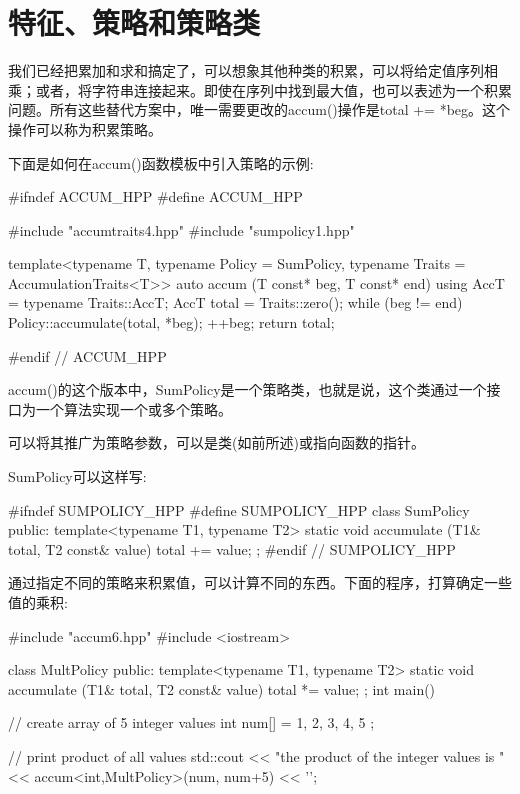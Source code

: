\section{特征、策略和策略类}

我们已经把累加和求和搞定了，可以想象其他种类的积累，可以将给定值序列相乘；或者，将字符串连接起来。即使在序列中找到最大值，也可以表述为一个积累问题。所有这些替代方案中，唯一需要更改的accum()操作是total += *beg。这个操作可以称为积累策略。

下面是如何在accum()函数模板中引入策略的示例:

\begin{cpp}
#ifndef ACCUM_HPP
#define ACCUM_HPP

#include "accumtraits4.hpp"
#include "sumpolicy1.hpp"

template<typename T,
		typename Policy = SumPolicy,
		typename Traits = AccumulationTraits<T>>
auto accum (T const* beg, T const* end)
{
	using AccT = typename Traits::AccT;
	AccT total = Traits::zero();
	while (beg != end) {
		Policy::accumulate(total, *beg);
		++beg;
	}
	return total;
}

#endif // ACCUM_HPP
\end{cpp}

accum()的这个版本中，SumPolicy是一个策略类，也就是说，这个类通过一个接口为一个算法实现一个或多个策略。

\begin{notice}
可以将其推广为策略参数，可以是类(如前所述)或指向函数的指针。
\end{notice}

SumPolicy可以这样写:

\begin{cpp}
#ifndef SUMPOLICY_HPP
#define SUMPOLICY_HPP
class SumPolicy {
	public:
	template<typename T1, typename T2>
	static void accumulate (T1& total, T2 const& value) {
		total += value;
	}
};
#endif // SUMPOLICY_HPP
\end{cpp}

通过指定不同的策略来积累值，可以计算不同的东西。下面的程序，打算确定一些值的乘积:

\begin{cpp}
#include "accum6.hpp"
#include <iostream>

class MultPolicy {
	public:
	template<typename T1, typename T2>
	static void accumulate (T1& total, T2 const& value) {
		total *= value;
	}
};
int main()
{
	// create array of 5 integer values
	int num[] = { 1, 2, 3, 4, 5 };
	
	// print product of all values
	std::cout << "the product of the integer values is "
			<< accum<int,MultPolicy>(num, num+5)
			<< ’\n’;
}
\end{cpp}

